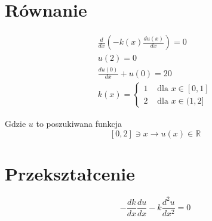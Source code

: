 \documentclass{article}
\begin{document}
\section{Równanie}
$$
\begin{gathered}
    \frac{d}{d x}(-k(x) \frac{d u(x)}{d x})=0 \\
    u(2)=0 \\
    \frac{d u(0)}{d x}+u(0)=20 \\
k(x)= \begin{cases}1 & \text { dla } x \in[0,1] \\
    2 & \text { dla } x \in(1,2]\end{cases}
\end{gathered}
$$

Gdzie $u$ to poszukiwana funkcja
$$
[0,2] \ni x \rightarrow u(x) \in \mathbb{R}
$$

\section{Przekształcenie}
$$
-\frac{dk}{dx}\frac{du}{dx} - k\frac{d^2u}{dx^2} = 0
$$
\end{document}
